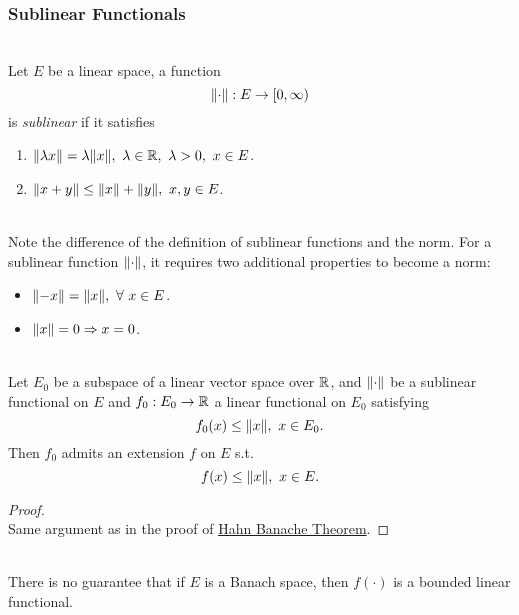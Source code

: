 \subsubsection{Sublinear Functionals}
\begin{definition}\ \\
    Let $E$ be a linear space, a function
    \begin{equation*}
        \norm{\cdot} : E \to [0, \infty)
    \end{equation*}
    is \textit{sublinear} if it satisfies
    \begin{enumerate}[label = (\alph*)]
        \item $\norm{\lambda x} = \lambda \norm{x},\ \lambda \in \R,\ \lambda > 0,\ x \in E$.
        \item $\norm{x + y} \leq \norm{x} + \norm{y},\ x,y \in E$.
    \end{enumerate}
\end{definition}
\begin{remark}\ \\
Note the difference of the definition of sublinear functions and the norm. For a sublinear function $\norm{\cdot}$, it requires two additional properties to become a norm:
\begin{itemize}
    \item $\norm{-x} = \norm{x},\ \forall\ x\in E$.
    \item $\norm{x} = 0 \Rightarrow x = 0$.
\end{itemize}
\end{remark}

\vspace{6pt}
\begin{theorem}\ \\
Let $E_0$ be a subspace of a linear vector space over $\mathbb{R}$, and $\norm{\cdot}$ be a sublinear functional on $E$ and $f_0: E_0 \to \mathbb{R}$ a linear functional on $E_0$ satisfying
\begin{equation*}
    f_0(x) \leq \norm{x},\ x \in E_0.
\end{equation*}
Then $f_0$ admits an extension $f$ on $E$ s.t.
\begin{equation*}
    f(x) \leq \norm{x},\ x \in E.
\end{equation*}
\end{theorem}
\begin{proof}\ \\
Same argument as in the proof of \hyperref[HB thm]{Hahn Banache Theorem}.
\end{proof}
\begin{remark}\ \\
There is no guarantee that if $E$ is a Banach space, then $f(\cdot)$ is a bounded linear functional.
\end{remark}

